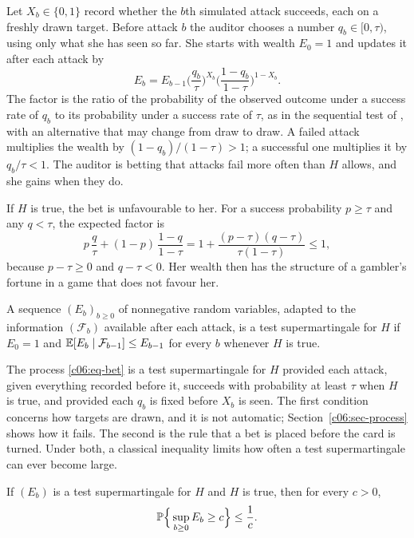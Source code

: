 Let $X_b \in \{0,1\}$ record whether the $b$th simulated attack succeeds, each on a
freshly drawn target. Before attack $b$ the auditor chooses a number
$q_b \in [0, \tau)$, using only what she has seen so far. She starts with wealth
$E_0 = 1$ and updates it after each attack by
\begin{equation}\label{c06:eq-bet}
E_b = E_{b-1} \Big(\frac{q_b}{\tau}\Big)^{X_b}
\Big(\frac{1-q_b}{1-\tau}\Big)^{1-X_b} .
\end{equation}
The factor is the ratio of the probability of the observed outcome under a
success rate of $q_b$ to its probability under a success rate of $\tau$, as in the
sequential test of \citet{wald1945}, with an alternative that may change from draw
to draw. A failed attack multiplies the wealth by $(1-q_b)/(1-\tau) > 1$; a
successful one multiplies it by $q_b/\tau < 1$. The auditor is betting that attacks
fail more often than $H$ allows, and she gains when they do.

If $H$ is true, the bet is unfavourable to her. For a success probability $p \ge
\tau$ and any $q < \tau$, the expected factor is
\begin{equation}\label{c06:eq-factor}
p\,\frac{q}{\tau} + (1-p)\,\frac{1-q}{1-\tau}
= 1 + \frac{(p-\tau)(q-\tau)}{\tau(1-\tau)} \le 1 ,
\end{equation}
because $p - \tau \ge 0$ and $q - \tau < 0$. Her wealth then has the structure of
a gambler's fortune in a game that does not favour her.

\begin{definition}\label{c06:def-test}
A sequence $(E_b)_{b \ge 0}$ of nonnegative random variables, adapted to the
information $(\mathcal{F}_b)$ available after each attack, is a test
supermartingale for $H$ if $E_0 = 1$ and
$\mathbb{E}[E_b \mid \mathcal{F}_{b-1}] \le E_{b-1}$ for every $b$ whenever $H$ is true.
\end{definition}

The process \eqref{c06:eq-bet} is a test supermartingale for $H$ provided each
attack, given everything recorded before it, succeeds with probability at least
$\tau$ when $H$ is true, and provided each $q_b$ is fixed before $X_b$ is seen.
The first condition concerns how targets are drawn, and it is not automatic;
Section~\ref{c06:sec-process} shows how it fails. The second is the rule that a bet
is placed before the card is turned. Under both, a classical inequality limits how
often a test supermartingale can ever become large.

\begin{proposition}\label{c06:prop-ville}
If $(E_b)$ is a test supermartingale for $H$ and $H$ is true, then for every
$c > 0$,
\begin{equation}\label{c06:eq-ville}
\mathbb{P}\Big\{\sup_{b \ge 0} E_b \ge c\Big\} \le \frac{1}{c} .
\end{equation}
\end{proposition}

